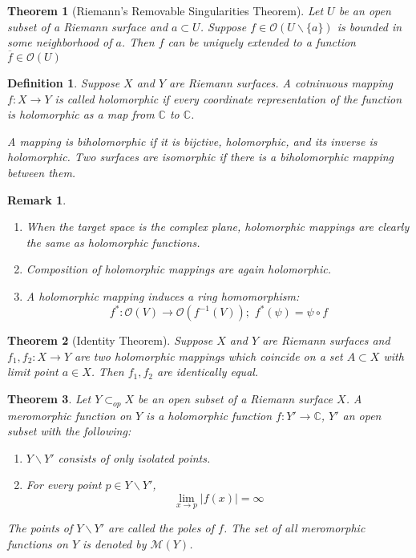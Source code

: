 \documentclass{article}
\newtheorem{thm}{Theorem}
\newtheorem{defn}{Definition}
\newtheorem{rmk}{Remark}
\begin{document}
\begin{thm}[Riemann's Removable Singularities Theorem]

Let $U$ be an open subset of a Riemann surface and $a \subset U$. Suppose $f \in \mathcal{O}(U \backslash \{a\})$ is bounded in some neighborhood of $a$. Then $f$ can be uniquely extended to a function $\overline{f} \in \mathcal{O}(U)$

\end{thm}

\begin{defn}

Suppose $X$ and $Y$ are Riemann surfaces. A cotninuous mapping $f:X \to Y$ is called \textit{holomorphic} if every coordinate representation of the function is holomorphic as a map from $\mathbb{C}$ to $\mathbb{C}$. \smallskip

A mapping is \textit{biholomorphic} if it is bijctive, holomorphic, and its inverse is holomorphic. Two surfaces are isomorphic if  there is a biholomorphic mapping between them.

\end{defn}

\begin{rmk}

\begin{enumerate}
    \item When the target space is the complex plane, holomorphic mappings are clearly the same as holomorphic functions.
    \item Composition of holomorphic mappings are again holomorphic.
    \item A holomorphic mapping induces a ring homomorphism:
    \[f^*: \mathcal{O}(V) \to \mathcal{O}(f^{-1}(V)); \hspace{4pt} f^*(\psi) = \psi \circ f\]
\end{enumerate}

\end{rmk}

\begin{thm}[Identity Theorem]

Suppose $X$ and $Y$ are Riemann surfaces and $f_1, f_2: X \to Y$ are two holomorphic mappings which coincide on a set $A \subset X$ with limit point $a \in X$. Then $f_1, f_2$ are identically equal.
\end{thm}

\begin{thm}

Let $Y \subset_{op} X$ be an open subset of a Riemann surface $X$. A \textit{meromorphic function} on $Y$ is a holomorphic function $f: Y' \to \mathbb{C}$, $Y'$ an open subset with the following:

\begin{enumerate}
    \item $Y\backslash Y'$ consists of only isolated points.
    \item For every point $p \in Y\backslash Y'$, 
    \[\lim_{x \to p} \vert f(x) \vert = \infty    \]
\end{enumerate}

The points of $Y \backslash Y'$ are called the \textit{poles} of $f$. The set of all meromorphic functions on $Y$ is denoted by $\mathcal{M}(Y)$. 
\end{thm}
\end{document}
